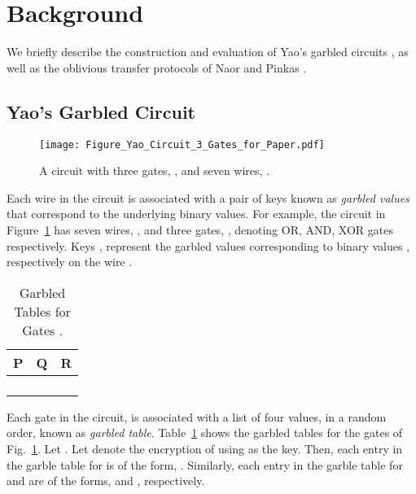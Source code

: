 \documentclass[10pt,journal,cspaper,compsoc]{IEEEtran}
\begin{document}
 \section{Background}
\label{sec_background}
We briefly describe the construction and evaluation of Yao's garbled circuits \cite{yao82,yao86}, as well as the oblivious transfer protocols of Naor and Pinkas \cite{naor01,naor05}.


\subsection{Yao's Garbled Circuit}

\begin{figure}[ht]
\centering
\texttt{[image: Figure\_Yao\_Circuit\_3\_Gates\_for\_Paper.pdf]}
\vspace{-3 mm}
\caption{A circuit with three gates, , and seven wires, .\vspace{-3 mm}}
\label{fig_sample_circuit}
\end{figure}


Each wire in the circuit is associated with a pair of keys known as {\em garbled values} that correspond to the underlying binary values. For example, the circuit in Figure~\ref{fig_sample_circuit} has seven wires, , and three gates, , denoting OR, AND, XOR gates respectively. Keys ,  represent the garbled values corresponding to binary values ,  respectively on the wire .


\begin{table}[!t]
\renewcommand{\arraystretch}{1.3}
\caption{Garbled Tables for Gates .}
\label{table_garbled_tables}
\centering
\begin{tabular}{||c||c||c||}
\hline
\bfseries P & \bfseries Q & \bfseries R\\
\hline
 &  & \\
 &  & \\
 &  & \\
 &  & \\
\hline
\end{tabular}
\vspace{-3 mm}
\end{table}


Each gate in the circuit, is associated with a list of four values, in a random order, known as {\em garbled table}. Table~\ref{table_garbled_tables} shows the garbled tables for the gates  of Fig.~\ref{fig_sample_circuit}. Let . Let  denote the encryption of  using  as the key. Then, each entry in the garble table for  is of the form, . Similarly, each entry in the garble table for  and  are of the forms,  and , respectively.
\end{document}
